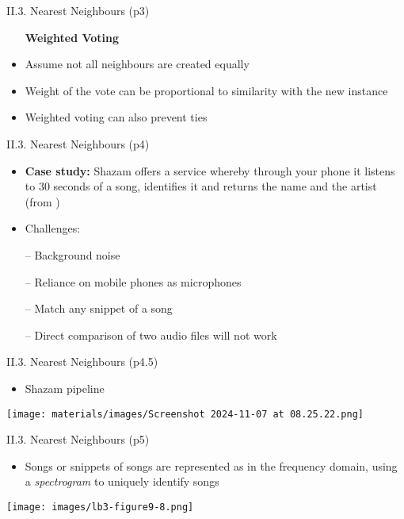 \documentclass[handout]{beamer}
\newcommand{\strong}[1]{\textbf{\color{teal} #1}}
\begin{document}
\begin{frame}{II.3. Nearest Neighbours (p3)}
\begin{itemize}
\item[] \strong{Weighted Voting}
\item[]
\item Assume not all neighbours are created equally
\item Weight of the vote can be proportional to similarity with the new instance
\item Weighted voting can also prevent ties
\end{itemize}
\end{frame}
\begin{frame}{II.3. Nearest Neighbours (p4)}
\begin{itemize}
\item \strong{Case study:} Shazam offers a service whereby through your phone it listens to 30 seconds of a song, identifies it and returns the name and the artist (from \cite[ch.9]{LB3:2011})
\item[] 
\item Challenges:
\item[--] Background noise
\item[--] Reliance on mobile phones as microphones
\item[--] Match any snippet of a song
\item[--] Direct comparison of two audio files will not work
\end{itemize}
\end{frame}
\begin{frame}{II.3. Nearest Neighbours (p4.5)}
\begin{itemize}
\item Shazam pipeline
\end{itemize}
\begin{center}
\texttt{[image: materials/images/Screenshot 2024-11-07 at 08.25.22.png]}\\
\cite[Cameroon MacLeod]{MacLeodShazam:2012}
\end{center}
\end{frame}
\begin{frame}{II.3. Nearest Neighbours (p5)}
\begin{itemize}
\item Songs or snippets of songs are represented as in the frequency domain, using a \emph{spectrogram} to uniquely identify songs
\end{itemize}
\begin{center}
\texttt{[image: images/lb3-figure9-8.png]}\\
\cite[Figure 9.8]{LB3:2011}
\end{center}
\end{frame}
\end{document}
